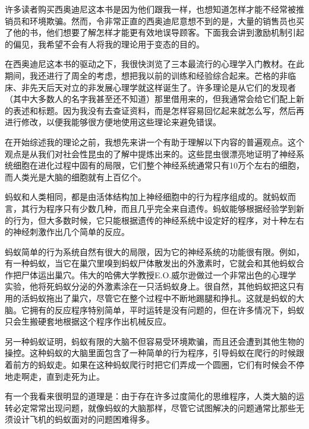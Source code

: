 许多读者购买西奥迪尼这本书是因为他们跟我一样，也想知道怎样才能不经常被推销员和环境欺骗。然而，令非常正直的西奥迪尼意想不到的是，大量的销售员也买了他的书，他们想要了解怎样才能更有效地误导顾客。下面我会讲到激励机制引起的偏见，我希望不会有人将我的理论用于变态的目的。
\par

在西奥迪尼这本书的驱动之下，我很快浏览了三本最流行的心理学入门教材。在此期间，我还进行了周全的考虑，想把我以前的训练和经验综合起来。芒格的非临床、非先天后天对立的非发展心理学就这样诞生了。许多理论是从它们的发现者（其中大多数人的名字我甚至还不知道）那里借用来的，但我通常会给它们配上新的表述和标题。因为我没有去查证资料，而是怎样容易回忆起来就怎么写，然后再进行修改，以便我能够很方便地使用这些理论来避免错误。
\par

在开始综述我的理论之前，我想先来讲一个有助于理解以下内容的普遍观点。这个观点是从我们对社会性昆虫的了解中提炼出来的。这些昆虫很漂亮地证明了神经系统细胞在进化过程中固有的局限，它们整个神经系统通常只有10万个左右的细胞，而人类光是大脑的细胞就有上百亿个。
\par

蚂蚁和人类相同，都是由活体结构加上神经细胞中的行为程序组成的。就蚂蚁而言，其行为程序只有少数几种，而且几乎完全来自遗传。蚂蚁能够根据经验学到新的行为，但大多数时候，它只能根据遗传的神经系统中设定好的程序，对十种左右的神经刺激作出几个简单的反应。
\par

蚂蚁简单的行为系统自然有很大的局限，因为它的神经系统的功能很有限。例如，有一种蚂蚁，当它在巢穴里嗅到蚂蚁尸体散发出的外激素时，它就会和其他蚂蚁合作把尸体运出巢穴。伟大的哈佛大学教授E.O.威尔逊做过一个非常出色的心理学实验，他将死蚂蚁分泌的外激素涂在一只活蚂蚁身上。很自然，其他蚂蚁把这只有用的活蚂蚁拖出了巢穴，尽管它在整个过程中不断地踢腿和挣扎。这就是蚂蚁的大脑。它拥有的反应程序特别简单，平时运转是没有问题的，但在许多情况下，蚂蚁只会生搬硬套地根据这个程序作出机械反应。
\par

另一种蚂蚁证明，蚂蚁有限的大脑不但容易受环境欺骗，而且还会遭到其他生物的操控。这种蚂蚁的大脑里面包含了一种简单的行为程序，引导蚂蚁在爬行的时候跟着前方的蚂蚁走。如果在这种蚂蚁爬行时把它们弄成一个圆圈，它们有时候会不停地走啊走，直到走死为止。
\par

有一个我看来很明显的道理是：由于存在许多过度简化的思维程序，人类大脑的运转必定常常出现问题，就像蚂蚁的大脑那样，尽管它试图解决的问题通常比那些无须设计飞机的蚂蚁面对的问题困难得多。
\par

